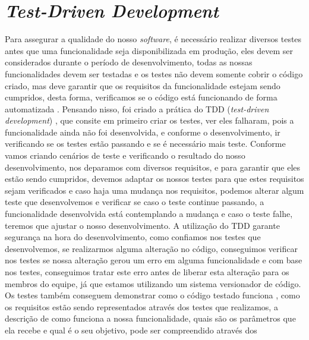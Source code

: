       \section{\textit{Test-Driven Development}}
        Para assegurar a qualidade do nosso \textit{software}, é necessário realizar
        diversos testes antes que uma funcionalidade seja disponibilizada em produção,
        eles devem ser considerados durante o período de desenvolvimento, todas
        as nossas funcionalidades devem ser testadas e os testes não devem somente
        cobrir o código criado, mas deve garantir que os requisitos da funcionalidade
        estejam sendo cumpridos, desta forma, verificamos se o código está funcionando
        de forma automatizada \cite{CleanCode}. \newline
        Pensando nisso, foi criado a prática do TDD (\textit{test-driven development})
        \cite{TestDrivenDevelopment}, que consite em primeiro criar os testes, ver
        eles falharam, pois a funcionalidade ainda não foi desenvolvida, e conforme
        o desenvolvimento, ir verificando se os testes estão passando e se é necessário
        mais teste. Conforme vamos criando cenários de teste e verificando o resultado
        do nosso desenvolvimento, nos deparamos com diversos requisitos, e para
        garantir que eles estão sendo cumpridos, devemos adaptar os nossos testes para
        que estes requisitos sejam verificados e caso haja uma mudança nos requisitos,
        podemos alterar algum teste que desenvolvemos e verificar se caso o teste
        continue passando, a funcionalidade desenvolvida está contemplando a mudança
        e caso o teste falhe, teremos que ajustar o nosso desenvolvimento. \newline
        A utilização do TDD garante segurança na hora do desenvolvimento, como
        confiamos nos testes que desenvolvemos, se realizarmos alguma alteração
        no código, conseguimos verificar nos testes se nossa alteração gerou um
        erro em alguma funcionalidade e com base nos testes, conseguimos tratar
        este erro antes de liberar esta alteração para os membros do equipe, já
        que estamos utilizando um sistema versionador de código. Os testes também
        conseguem demonstrar como o código testado funciona \cite{martin2007agile},
        como os requisitos estão sendo representados através dos testes que realizamos,
        a descrição de como funciona a nossa funcionalidade, quais são os parâmetros
        que ela recebe e qual é o seu objetivo, pode ser compreendido através dos
